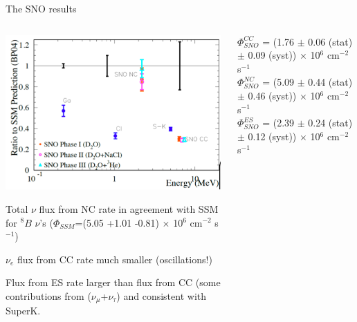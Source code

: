 \begin{frame}[t]{The SNO results}
\begin{columns}
  \begin{column}{0.35\textwidth}
     \includegraphics[width=0.99\textwidth]{./images/3nu/solar/sno_results.png}\\
     \begin{itemize}
     {\scriptsize
       \item Total $\nu$ flux from NC rate in agreement with SSM for $^{8}B$ $\nu$'s
             ($\Phi_{SSM}$=(5.05 +1.01 -0.81) $\times$ 10$^{6}$ cm$^{-2}$ s$^{-1}$)
       \item $\nu_{e}$ flux from CC rate much smaller (oscillations!)
       \item Flux from ES rate larger than flux from CC (some contributions from ($\nu_{\mu}$+$\nu_{\tau}$)
             and consistent with SuperK.\\
     }
     \end{itemize}
  \end{column}
  \begin{column}{0.65\textwidth}
     {\scriptsize
       {\color{red}
         $\Phi^{CC}_{SNO}$ = (1.76 $\pm$ 0.06 (stat) $\pm$ 0.09 (syst))
            $\times$ 10$^{6}$ cm$^{-2}$ s$^{-1}$\\
       }
       {\color{blue}
         $\Phi^{NC}_{SNO}$ = (5.09 $\pm$ 0.44 (stat) $\pm$ 0.46 (syst))
            $\times$ 10$^{6}$ cm$^{-2}$ s$^{-1}$\\
       }
       {\color{green}
         $\Phi^{ES}_{SNO}$ = (2.39 $\pm$ 0.24 (stat) $\pm$ 0.12 (syst))
            $\times$ 10$^{6}$ cm$^{-2}$ s$^{-1}$\\
       }
     }

\end{column}
\end{columns}
\end{frame}

